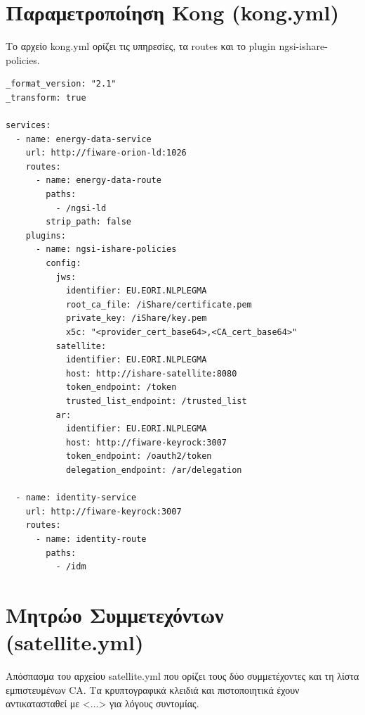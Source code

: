 \section{Παραμετροποίηση \textlatin{Kong} (\textlatin{kong.yml})}
\label{app:kong-yml}

Το αρχείο \textlatin{kong.yml} ορίζει τις υπηρεσίες, τα
\textlatin{routes} και το \textlatin{plugin}
\textlatin{ngsi-ishare-policies}.

\begin{lstlisting}[language={},]
_format_version: "2.1"
_transform: true

services:
  - name: energy-data-service
    url: http://fiware-orion-ld:1026
    routes:
      - name: energy-data-route
        paths:
          - /ngsi-ld
        strip_path: false
    plugins:
      - name: ngsi-ishare-policies
        config:
          jws:
            identifier: EU.EORI.NLPLEGMA
            root_ca_file: /iShare/certificate.pem
            private_key: /iShare/key.pem
            x5c: "<provider_cert_base64>,<CA_cert_base64>"
          satellite:
            identifier: EU.EORI.NLPLEGMA
            host: http://ishare-satellite:8080
            token_endpoint: /token
            trusted_list_endpoint: /trusted_list
          ar:
            identifier: EU.EORI.NLPLEGMA
            host: http://fiware-keyrock:3007
            token_endpoint: /oauth2/token
            delegation_endpoint: /ar/delegation

  - name: identity-service
    url: http://fiware-keyrock:3007
    routes:
      - name: identity-route
        paths:
          - /idm
\end{lstlisting}

\section{Μητρώο Συμμετεχόντων (\textlatin{satellite.yml})}
\label{app:satellite-yml}

Απόσπασμα του αρχείου \textlatin{satellite.yml} που ορίζει τους δύο
συμμετέχοντες και τη λίστα εμπιστευμένων \textlatin{CA}. Τα
κρυπτογραφικά κλειδιά και πιστοποιητικά έχουν αντικατασταθεί με
\textlatin{<...>} για λόγους συντομίας.

